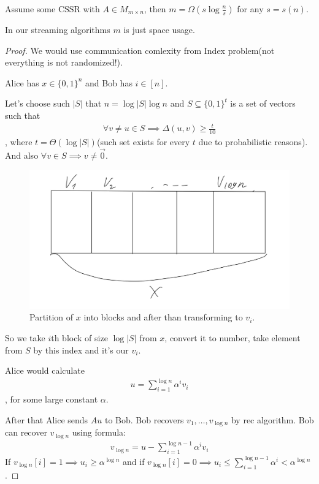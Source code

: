 \begin{thm}
	Assume some CSSR with $A \in M_{m \times n}$, then $m = \Omega\left(s \log \frac n s\right)$ for any $s = s(n)$.
\end{thm}
\begin{remrk}
	In our streaming algorithms $m$ is just space usage.
\end{remrk}
\begin{proof}
	We would use communication comlexity from Index problem(not everything is not randomized!).
	
	Alice has $x \in \{0, 1\}^n$ and Bob has $i \in [n]$.
	
	Let's choose such $|S|$ that $n = \log |S| \log n$ and $S \subseteq \{0, 1\}^t$ is a set of vectors such that
	\begin{align*}
		\forall v \neq u \in S \implies \Delta(u, v) \geq \frac t {10}
	\end{align*}, where $t = \Theta(\log |S|)$(such set exists for every $t$ due to probabilistic reasons).
	And also $\forall v \in S \implies v \neq \vec 0$.
	
	\begin{figure}[H]
	\centering
	\includegraphics[width=0.4\linewidth]{figures/proof_cssr_blocks.jpeg}
	\caption{Partition of $x$ into blocks and after than transforming to $v_i$.}
	\label{fig:proof_cssr_blocks}
	\end{figure}
	
	So we take $i$th block of size $\log |S|$ from $x$, convert it to number, take element from $S$ by this index and it's our $v_i$.
	
	Alice would calculate
	\begin{align*}
		u = \sum_{i = 1}^{\log n} \alpha^i v_i
	\end{align*}, for some large constant $\alpha$.
	
	After that Alice sends $Au$ to Bob.
	Bob recovers $v_1, \ldots, v_{\log n}$ by rec algorithm.
	Bob can recover $v_{\log n}$ using formula:
	\begin{align*}
		v_{\log n} = u - \sum_{i = 1}^{\log n - 1} \alpha^i v_i
	\end{align*}
	If $v_{\log n}[i] = 1 \implies u_i \geq \alpha^{\log n}$ and if $v_{\log n}[i] = 0 \implies u_i \leq \sum_{i = 1}^{\log n - 1} \alpha^i < \alpha^{\log n}$.
	

\end{proof}

